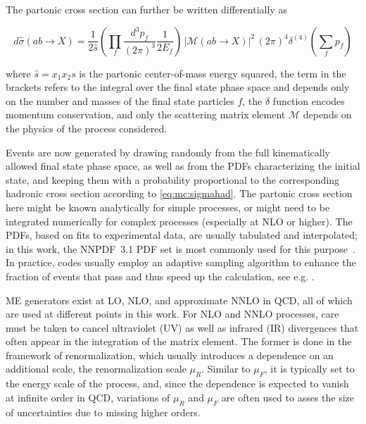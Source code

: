 
The partonic cross section can further be written differentially as~\cite{Peskin:1995ev}

\begin{equation}
    d \hat{\sigma} (a b \rightarrow X) = \frac{1}{2 \hat{s}} \left( \prod_f \frac{d^3 p_f}{(2\pi)^3} \frac{1}{2 E_f} \right) \, \left| \mathcal{M} (a b \rightarrow 
    X ) \right|^2 \, (2\pi)^4 \delta^{(4)} \left( \sum_f p_f \right)
\end{equation}

\noindent where $\hat{s} = x_1 x_2 s$ is the partonic center-of-mass energy squared, the term in the brackets refers to the integral over the final state phase space and depends only on the number and masses of the final state particles $f$, the $\delta$ function encodes momentum conservation, and only the scattering matrix element $\mathcal{M}$ depends on the physics of the process considered.

Events are now generated by drawing randomly from the full kinematically allowed final state phase space, as well as from the PDFs characterizing the initial state, and keeping them with a probability proportional to the corresponding hadronic cross section according to \cref{eq:mc:sigmahad}. The partonic cross section here might be known analytically for simple processes, or might need to be integrated numerically for complex processes (especially at NLO or higher). The PDFs, based on fits to experimental data, are usually tabulated and interpolated; in this work, the NNPDF~3.1 PDF set is most commonly used for this purpose~\cite{NNPDF:2017mvq}. In practice, codes usually employ an adaptive sampling algorithm to enhance the fraction of events that pass and thus speed up the calculation, see e.g. .

ME generators exist at LO, NLO, and approximate NNLO in QCD, all of which are used at different points in this work. For NLO and NNLO processes, care must be taken to cancel ultraviolet (UV) as well as infrared (IR) divergences that often appear in the integration of the matrix element. The former is done in the framework of renormalization, which usually introduces a dependence on an additional scale, the renormalization scale $\mu_R$. Similar to $\mu_F$, it is typically set to the energy scale of the process, and, since the dependence is expected to vanish at infinite order in QCD, variations of $\mu_R$ and $\mu_F$ are often used to asses the size of uncertainties due to missing higher orders.

